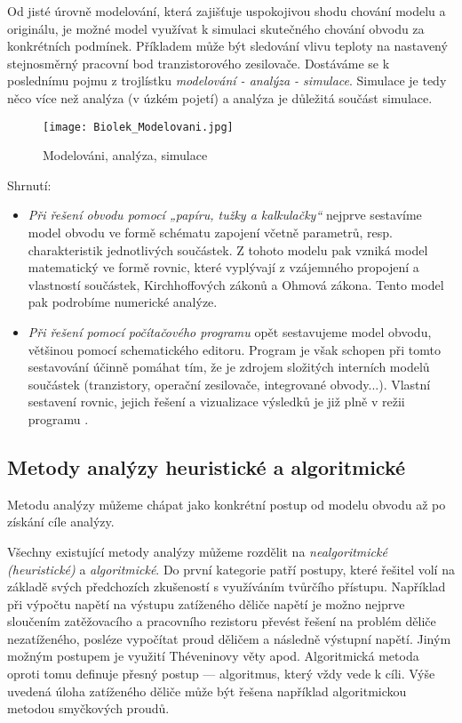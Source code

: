 {      Od jisté úrovně modelování, která zajišťuje uspokojivou shodu chování modelu a originálu, je 
      možné model využívat k simulaci skutečného chování obvodu za konkrétních podmínek. Příkladem 
      může být sledování vlivu teploty na nastavený stejnosměrný pracovní bod tranzistorového 
      zesilovače. Dostáváme se k poslednímu pojmu z trojlístku \emph{modelování - analýza - 
      simulace}. Simulace je tedy něco více než analýza (v úzkém pojetí) a analýza je důležitá 
      součást simulace.
      
      \begin{figure}[ht!]
        \centering
        \texttt{[image: Biolek\_Modelovani.jpg]}
        \caption{Modelováni, analýza, simulace \cite[s.~17]{Biolek}}
        \label{TEO:fig_modelovani}
      \end{figure}
      
      Shrnutí:
      \begin{itemize}
        \itemsep0em
        \item \emph{Při řešení obvodu pomocí „papíru, tužky a kalkulačky“} nejprve sestavíme model 
              obvodu ve formě schématu zapojení včetně parametrů, resp. charakteristik jednotlivých 
              součástek. Z tohoto modelu pak vzniká model matematický ve formě rovnic, které 
              vyplývají z vzájemného propojení a vlastností součástek, Kirchhoffových zákonů a 
              Ohmová zákona. Tento model pak podrobíme numerické analýze.      
        \item \emph{Při řešení pomocí počítačového programu} opět sestavujeme model obvodu,  
              většinou pomocí schematického editoru. Program je však schopen při tomto sestavování 
              účinně pomáhat tím, že je zdrojem složitých interních modelů součástek (tranzistory, 
              operační zesilovače, integrované obvody...). Vlastní sestavení rovnic, jejich řešení 
              a vizualizace výsledků je již plně v režii programu \cite[s.~18]{Biolek}.
      \end{itemize}
      
    \subsection{Metody analýzy heuristické a algoritmické}
      Metodu analýzy můžeme chápat jako konkrétní postup od modelu obvodu až po získání cíle analýzy.
      
      Všechny existující metody analýzy můžeme rozdělit na \emph{nealgoritmické (heuristické)} a 
      \emph{algoritmické}. Do první kategorie patří postupy, které řešitel volí na základě svých 
      předchozích zkušeností s využíváním tvůrčího přístupu. Například při výpočtu napětí na 
      výstupu zatíženého děliče napětí je možno nejprve sloučením zatěžovacího a pracovního 
      rezistoru převést řešení na problém děliče nezatíženého, posléze vypočítat proud děličem a 
      následně výstupní napětí. Jiným možným postupem je využití Théveninovy věty apod. 
      Algoritmická metoda oproti tomu definuje přesný postup — algoritmus, který vždy vede k cíli. 
      Výše uvedená úloha zatíženého děliče může být řešena například algoritmickou metodou 
      smyčkových proudů.
      
}
